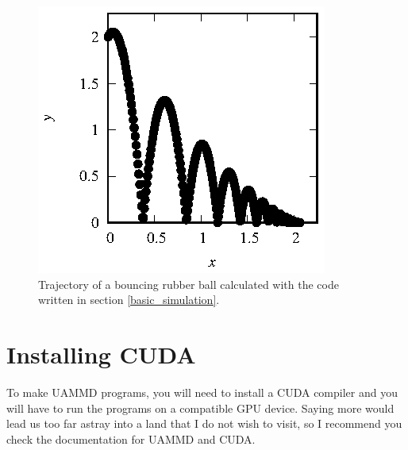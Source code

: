 \begin{figure}
  \centering
  \includegraphics[width = 0.65 \textwidth]{figures/rubberBall.eps}
  \caption{\label{rubberBall}Trajectory of a bouncing rubber ball calculated
           with the code written in section \ref{basic_simulation}.}
\end{figure}


\section*{Installing CUDA}

To make UAMMD programs, you will need to install a CUDA compiler and you will
have to run the programs on a compatible GPU device. Saying more would lead us
too far astray into a land that I do not wish to visit, so I recommend you check
the documentation for UAMMD and CUDA.
